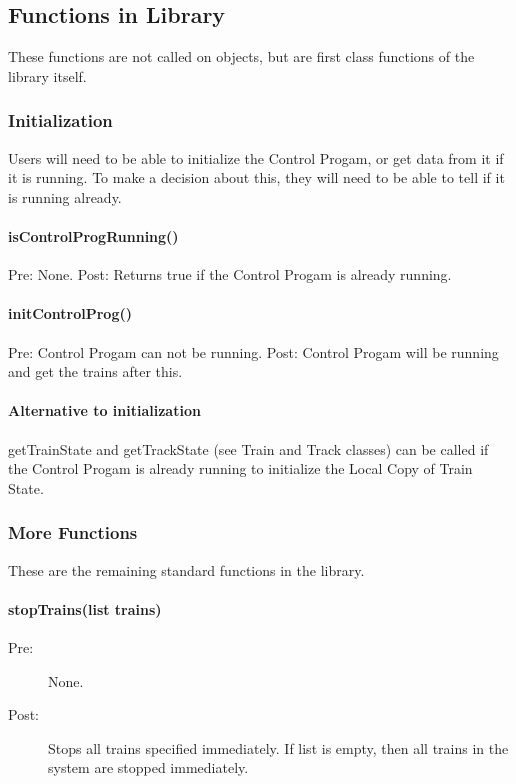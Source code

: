 \documentclass[a4paper,11pt,notitlepage]{article}
\def\CS{Control Progam\xspace}
\def\LC{Local Copy of Train State\xspace}
\begin{document}
\subsection{Functions in Library}
These functions are not called on objects, but are first class functions of the library itself.

\subsubsection{Initialization}
Users will need to be able to initialize the \CS, or get data from it if it is running. To make a decision about this, they will need to be able to tell if it is running already.
\paragraph{isControlProgRunning()} Pre: None. Post: Returns true if the \CS is already running.
\paragraph{initControlProg()} Pre: \CS can not be running. Post: \CS will be running and get the trains after this. %
\paragraph{Alternative to initialization} getTrainState and getTrackState (see Train and Track classes) can be called if the \CS is already running to initialize the \LC.
\subsubsection{More Functions}
These are the remaining standard functions in the library.
\paragraph{stopTrains(list trains)}
\begin{description}
\item[\hspace{1cm}Pre:] None.
\item[\hspace{1cm}Post:] Stops all trains specified immediately. If list is empty, then all trains in the system are stopped immediately.
\end{description}
\end{document}
